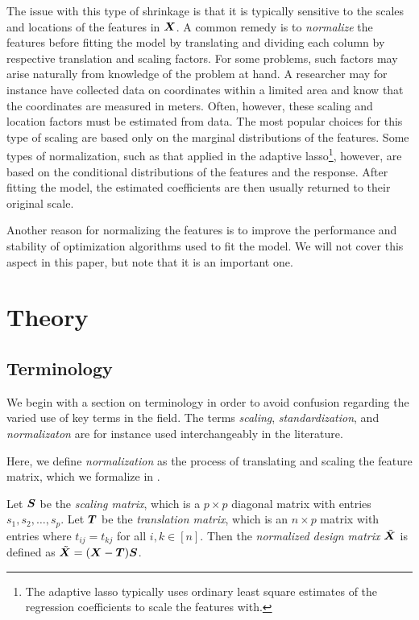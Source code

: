 
The issue with this type of shrinkage is that it is typically sensitive to the scales and locations of the features in \(\mat X\).
A common remedy is to \emph{normalize} the features before fitting the model by translating and dividing each column by respective translation and scaling factors.
For some problems, such factors may arise naturally from knowledge of the problem at hand.
A researcher may for instance have collected data on coordinates within a limited area and know that the coordinates are measured in meters.
Often, however, these scaling and location factors must be estimated from data.
The most popular choices for this type of scaling are based only on the marginal distributions of the features.
Some types of normalization, such as that applied in the adaptive lasso\footnote{The adaptive lasso typically uses ordinary least square estimates of the regression coefficients to scale the features with.}, however, are based on the conditional distributions of the features and the response.
After fitting the model, the estimated coefficients are then usually returned to their original scale.

Another reason for normalizing the features is to improve the performance and stability of optimization algorithms used to fit the model.
We will not cover this aspect in this paper, but note that it is an important one.

\section{Theory}

\subsection{Terminology}

We begin with a section on terminology in order to avoid confusion regarding the varied use of key terms in the field. The terms \emph{scaling}, \emph{standardization}, and \emph{normalizaton} are for instance used interchangeably in the literature.

Here, we define \emph{normalization} as the process of translating and scaling the feature matrix, which we formalize in .

\begin{definition}[Normalization]
  \label{def:normalization}
  Let \(\mat S\) be the \emph{scaling matrix}, which is a \(p \times p\) diagonal matrix with entries \(s_1, s_2, \dots, s_p\). Let \(\mat T\) be the \emph{translation matrix}, which is an \(n \times p\) matrix with entries where \(t_{ij} = t_{kj}\) for all \(i,k \in [n]\). Then the \emph{normalized design matrix} \(\tilde{\mat X}\) is defined as \(\tilde{\mat X} = (\mat X - \mat T)\mat S\).
\end{definition}

